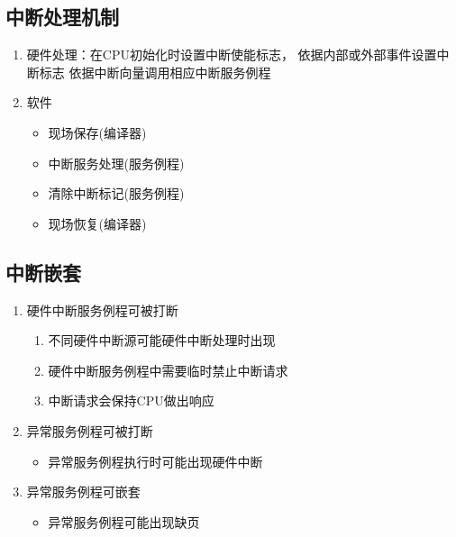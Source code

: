\subsection{中断处理机制}
\begin{enumerate}
	\item 硬件处理：在CPU初始化时设置中断使能标志，
	\subitem 依据内部或外部事件设置中断标志
	\subitem 依据中断向量调用相应中断服务例程
	\item 软件
	\begin{itemize}
		\item 现场保存(编译器)
		\item 中断服务处理(服务例程)
		\item 清除中断标记(服务例程)
		\item 现场恢复(编译器)
	\end{itemize}
\end{enumerate}
\subsection{中断嵌套}
\begin{enumerate}
	\item 硬件中断服务例程可被打断
	\begin{enumerate}
		\item 不同硬件中断源可能硬件中断处理时出现
		\item 硬件中断服务例程中需要临时禁止中断请求
		\item 中断请求会保持CPU做出响应
	\end{enumerate}
	\item 异常服务例程可被打断
	\begin{itemize}
		\item 异常服务例程执行时可能出现硬件中断
	\end{itemize}
	\item 异常服务例程可嵌套
	\begin{itemize}
		\item 异常服务例程可能出现缺页
	\end{itemize}
\end{enumerate}
